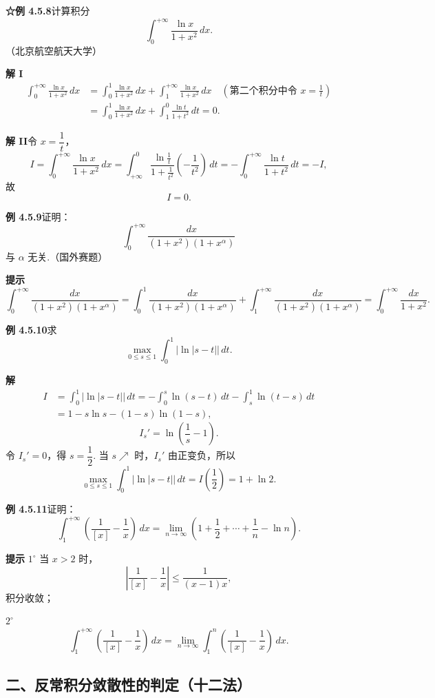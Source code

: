 \documentclass[UTF8, 12pt, fontset=fandol, oneside]{ctexart}
\begin{document}
\noindent\textbf{☆例 4.5.8}\quad 计算积分
\[
\int_0^{+\infty}\frac{\ln x}{1+x^2}\,dx.
\]
（北京航空航天大学）

\noindent\textbf{解 I}\quad
\[
\begin{aligned}
\int_0^{+\infty}\frac{\ln x}{1+x^2}\,dx
&=\int_0^1\frac{\ln x}{1+x^2}\,dx
+\int_1^{+\infty}\frac{\ln x}{1+x^2}\,dx
\quad\left(\text{第二个积分中令 }x=\frac1t\right)\\
&=\int_0^1\frac{\ln x}{1+x^2}\,dx
+\int_1^0\frac{\ln t}{1+t^2}\,dt=0.
\end{aligned}
\]

\noindent\textbf{解 II}\quad 令 $x=\dfrac1t$，
\[
I=\int_0^{+\infty}\frac{\ln x}{1+x^2}\,dx
=\int_{+\infty}^0
\frac{\ln\frac1t}{1+\frac1{t^2}}\left(-\frac1{t^2}\right)\,dt
=-\int_0^{+\infty}\frac{\ln t}{1+t^2}\,dt=-I,
\]
故
\[
I=0.
\]

\noindent\textbf{例 4.5.9}\quad 证明：
\[
\int_0^{+\infty}\frac{dx}{(1+x^2)(1+x^\alpha)}
\]
与 $\alpha$ 无关.（国外赛题）

\noindent\textbf{提示}\quad
\[
\int_0^{+\infty}\frac{dx}{(1+x^2)(1+x^\alpha)}
=\int_0^1\frac{dx}{(1+x^2)(1+x^\alpha)}
+\int_1^{+\infty}\frac{dx}{(1+x^2)(1+x^\alpha)}
=\int_0^{+\infty}\frac{dx}{1+x^2}.
\]

\noindent\textbf{例 4.5.10}\quad 求
\[
\max_{0\le s\le1}\int_0^1|\ln|s-t||\,dt.
\]

\noindent\textbf{解}\quad
\[
\begin{aligned}
I&=\int_0^1|\ln|s-t||\,dt
=-\int_0^s\ln(s-t)\,dt-\int_s^1\ln(t-s)\,dt\\
&=1-s\ln s-(1-s)\ln(1-s),
\end{aligned}
\]
\[
I_s'=\ln\left(\frac1s-1\right).
\]
令 $I_s'=0$，得 $s=\dfrac12$.
当 $s\nearrow$ 时，$I_s'$ 由正变负，所以
\[
\max_{0\le s\le1}\int_0^1|\ln|s-t||\,dt
=I\left(\frac12\right)=1+\ln2.
\]

\noindent\textbf{例 4.5.11}\quad 证明：
\[
\int_1^{+\infty}\left(\frac1{[x]}-\frac1x\right)\,dx
=\lim_{n\to\infty}\left(1+\frac12+\cdots+\frac1n-\ln n\right).
\]

\noindent\textbf{提示}\quad
$1^\circ$ 当 $x>2$ 时，
\[
\left|\frac1{[x]}-\frac1x\right|\le\frac1{(x-1)x},
\]
积分收敛；

$2^\circ$
\[
\int_1^{+\infty}\left(\frac1{[x]}-\frac1x\right)\,dx
=\lim_{n\to\infty}\int_1^n\left(\frac1{[x]}-\frac1x\right)\,dx.
\]

\subsection*{二、反常积分敛散性的判定（十二法）}
\end{document}
